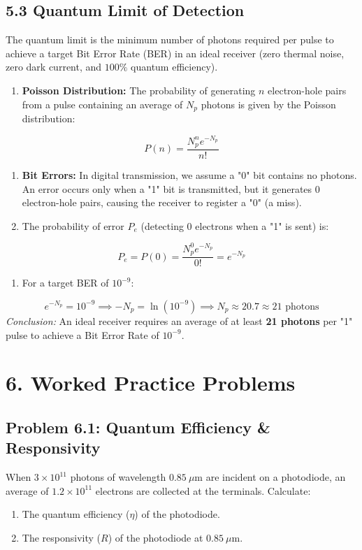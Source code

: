 \subsection{5.3 Quantum Limit of Detection}
The quantum limit is the minimum number of photons required per pulse to achieve a target Bit Error Rate (BER) in an ideal receiver (zero thermal noise, zero dark current, and $100\%$ quantum efficiency).
\begin{enumerate}
  \item \textbf{Poisson Distribution:} The probability of generating $n$ electron-hole pairs from a pulse containing an average of $N_p$ photons is given by the Poisson distribution:
\end{enumerate}
    \[ P(n) = \frac{N_p^n e^{-N_p}}{n!} \]
\begin{enumerate}
  \item \textbf{Bit Errors:} In digital transmission, we assume a "0" bit contains no photons. An error occurs only when a "1" bit is transmitted, but it generates $0$ electron-hole pairs, causing the receiver to register a "0" (a miss).
  \item The probability of error $P_e$ (detecting 0 electrons when a "1" is sent) is:
\end{enumerate}
    \[ P_e = P(0) = \frac{N_p^0 e^{-N_p}}{0!} = e^{-N_p} \]
\begin{enumerate}
  \item For a target BER of $10^{-9}$:
\end{enumerate}
    \[ e^{-N_p} = 10^{-9} \implies -N_p = \ln(10^{-9}) \implies N_p \approx 20.7 \approx 21\text{ photons} \]
\textit{Conclusion:} An ideal receiver requires an average of at least \textbf{21 photons} per "1" pulse to achieve a Bit Error Rate of $10^{-9}$.


\section{6. Worked Practice Problems}

\subsection{Problem 6.1: Quantum Efficiency \& Responsivity}
When $3 \times 10^{11}$ photons of wavelength $0.85\ \mu\text{m}$ are incident on a photodiode, an average of $1.2 \times 10^{11}$ electrons are collected at the terminals. Calculate:
\begin{enumerate}
  \item The quantum efficiency ($\eta$) of the photodiode.
  \item The responsivity ($R$) of the photodiode at $0.85\ \mu\text{m}$.
\end{enumerate}

